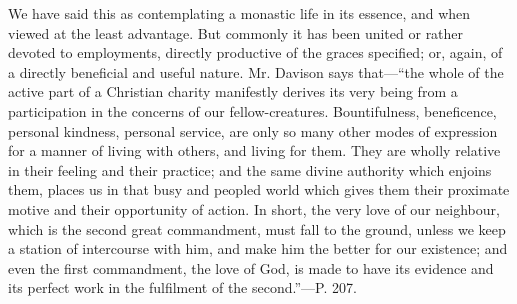 We have said this as contemplating a monastic
life in its essence, and when viewed at the least advantage. But
commonly it has been united or rather devoted to employments, directly
productive of the graces specified; or, again, of a directly
beneficial and useful nature. Mr. Davison says that—``the whole of
the active part of a Christian charity manifestly derives its very
being from a participation in the concerns of our fellow-creatures.
Bountifulness, beneficence, personal kindness, personal service, are
only so many other modes of expression for a manner of living with
others, and living for them. They are wholly relative in their feeling
and their practice; and the same divine authority which enjoins them,
places us in that busy and peopled world which gives them their
proximate motive and their opportunity of action. In short, the very
love of our neighbour, which is the second great commandment, must
fall to the ground, unless we keep a station of intercourse with
him, and make him the better for our existence; and even the first
commandment, the love of God, is made to have its evidence and its
perfect work in the fulfilment of the second.''—P. 207.

